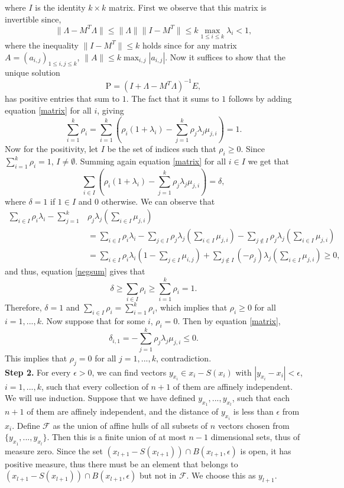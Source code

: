 \documentclass[footinclude=true]{amsart}
\theoremstyle{plain}
\begin{document}
where $I$ is the identity $k\times k$ matrix.
First we observe that this matrix is invertible since,
$$\|\Lambda-M^{T}\Lambda\|\leq \|\Lambda\|\|I-M^{T}\|\leq k\max_{1\leq i\leq k}\lambda_i<1,$$ where the inequality $\|I-M^{T}\|\leq k$ holds since for any matrix $A=(a_{i,j})_{1\leq i,j\leq k}$, $\|A\|\leq k\max_{i,j}|a_{i,j}|$.
Now it suffices to show that the unique solution 
$$\mathrm{P}=(I+\Lambda-M^{T}\Lambda)^{-1}E,$$ has positive entries that sum to $1$. The fact that it sums to $1$ follows by adding equation \eqref{matrix} for all $i$, giving $$\sum_{i=1}^{k}\rho_i=\sum_{i=1}^{k}\left(\rho_i (1+\lambda_i)-\sum_{j=1}^k\rho_j\lambda_j\mu_{j,i} \right)=1.$$ 
Now for the positivity, let $I$ be the set of indices such that $\rho_i \geq 0$. Since $\sum_{i=1}^k\rho_i=1$, $I\neq\emptyset$. Summing again equation \eqref{matrix} for all $i\in I$ we get that
\begin{equation}\label{negsum} \sum_{i\in I}\left(\rho_i (1+\lambda_i)-\sum_{j=1}^k\rho_j\lambda_j\mu_{j,i} \right)=\delta,
	\end{equation} where $\delta=1$ if $1\in I$ and $0$ otherwise. We can observe that
\begin{align*}
	 \sum_{i\in I}\rho_i \lambda_i-\sum_{j=1}^k&\rho_j\lambda_j(\sum_{i\in I}\mu_{j,i}) 
	\\ &= \sum_{i\in I}\rho_i \lambda_i-\sum_{j\in I}\rho_j\lambda_j(\sum_{i\in I}\mu_{j,i})-\sum_{j\notin I}\rho_j\lambda_j(\sum_{i\in I}\mu_{j,i})  \\
	&= \sum_{i\in I}\rho_i \lambda_i(1-\sum_{j\in I}\mu_{i,j})+\sum_{j\notin I}(-\rho_j)\lambda_j(\sum_{i\in I}\mu_{j,i})\geq 0,  
\end{align*}
and thus, equation \eqref{negsum} gives that 
$$\delta\geq \sum_{i\in I}\rho_i\geq \sum_{i=1}^k \rho_i =1.$$ Therefore, $\delta=1$ and $\sum_{i\in I}\rho_i= \sum_{i=1}^k \rho_i$, which implies that $\rho_i\geq 0$ for all $i=1,...,k$. Now suppose that for some $i$, $\rho_i=0.$ Then by equation \eqref{matrix}, $$\delta_{i,1}=-\sum_{j=1}^k \rho_j \lambda_j \mu_{j,i}\leq 0.$$ This implies that $\rho_j=0$ for all $j=1,...,k$, contradiction.
\\ \textbf{Step 2.} For every $\epsilon>0$, we can find vectors $y_{x_i}\in x_i-S(x_i)$ with $|y_{x_i}-x_i|<\epsilon$, $i=1,...,k$, such that every collection of $n+1$ of them are affinely independent. We will use induction. Suppose that we have defined $y_{x_1},...,y_{x_l}$, such that each $n+1$ of them are affinely independent, and the distance of $y_{x_i}$ is less than $\epsilon$ from $x_i$. Define $\mathscr{F}$ as the union of affine hulls of all subsets of $n$ vectors chosen from $\{y_{x_1},..., y_{x_l}\}$. Then this is a finite union of at most $n-1$ dimensional sets, thus of measure zero. Since the set $(x_{l+1}-S(x_{l+1}))\cap B(x_{l+1},\epsilon)$ is open, it has positive measure, thus there must be an element that belongs to $(x_{l+1}-S(x_{l+1}))\cap B(x_{l+1},\epsilon)$ but not in $\mathscr{F}$. We choose this as $y_{l+1}$.
\end{document}
